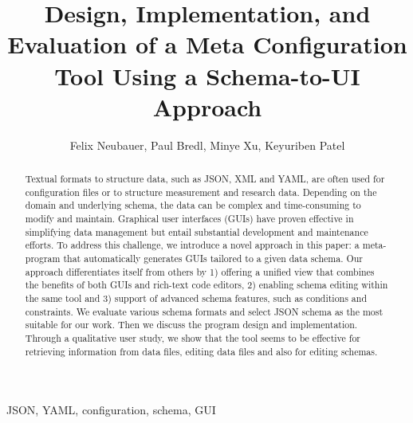 \documentclass[lettersize,journal]{IEEEtran}
\begin{document}
 \title{Design, Implementation, and Evaluation of a Meta Configuration Tool Using a Schema-to-UI Approach}
 \author{Felix Neubauer, Paul Bredl, Minye Xu, Keyuriben Patel}



 \maketitle

 \begin{abstract}
 Textual formats to structure data, such as JSON, XML and YAML, are often used for configuration files or to structure measurement and research data.
 Depending on the domain and underlying schema, the data can be complex and time-consuming to modify and maintain.
 Graphical user interfaces (GUIs) have proven effective in simplifying data management but entail substantial development and maintenance efforts.
 To address this challenge, we introduce a novel approach in this paper: a meta-program that automatically generates GUIs tailored to a given data schema.
 Our approach differentiates itself from others by 1) offering a unified view that combines the benefits of both GUIs and rich-text code editors, 2) enabling schema editing within the same tool and 3) support of advanced schema features, such as conditions and constraints.
 We evaluate various schema formats and select JSON schema as the most suitable for our work.
 Then we discuss the program design and implementation.
 Through a qualitative user study, we show that the tool seems to be effective for retrieving information from data files, editing data files and also for editing schemas.



 \end{abstract}

 \begin{IEEEkeywords}
  JSON, YAML, configuration, schema, GUI
 \end{IEEEkeywords}
\end{document}
